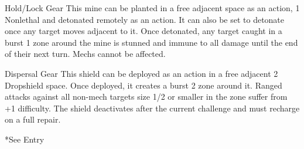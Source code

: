                                                                                                                    


 Hold/Lock          Gear        This mine can be planted in a free adjacent space as an action,      1 
 Nonlethal                      and detonated remotely as an action. It can also be set to  
                                detonate once any target moves adjacent to it. Once detonated,  
                                any target caught in a burst 1 zone around the mine is stunned  
                                and immune to all damage until the end of their next turn. Mechs  
                                cannot be affected. 

 Dispersal          Gear        This shield can be deployed as an action in a free adjacent          2 
 Dropshield                     space. Once deployed, it creates a burst 2 zone around it.  
                                Ranged attacks against all non-mech targets size 1/2 or smaller in  
                                the zone suffer from +1 difficulty. The shield deactivates after the  
                                current challenge and must recharge on a full repair. 

*See Entry  

